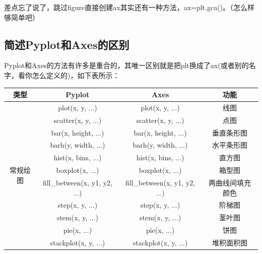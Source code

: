 \documentclass[12pt]{article}
\begin{document}
差点忘了说了，跳过figure直接创建ax其实还有一种方法，ax=plt.gca()。（怎么样够简单吧）
\newpage
\subsection{简述Pyplot和Axes的区别}

Pyplot和Axes的方法有许多是重合的，其唯一区别就是把plt换成了ax(或者别的名字，看你怎么定义的)，如下表所示：

\begin{table}[H]
\centering
\begin{tabular}{|c|c|c|c|}
\hline
类型                     & Pyplot                        & Axes                          & 功能           \\ \hline
\multirow{11}{*}{常规绘图} & plot(x, y, ...)               & plot(x, y, ...)               & 线图           \\ \cline{2-4} 
                       & scatter(x, y, ...)            & scatter(x, y, ...)            & 点图           \\ \cline{2-4} 
                       & bar(x, height, ...)           & bar(x, height, ...)           & 垂直条形图        \\ \cline{2-4} 
                       & barh(y, width, ...)           & barh(y, width, ...)           & 水平条形图        \\ \cline{2-4} 
                       & hist(x, bins, ...)            & hist(x, bins, ...)            & 直方图          \\ \cline{2-4} 
                       & boxplot(x, ...)               & boxplot(x, ...)               & 箱型图          \\ \cline{2-4} 
                       & fill\_between(x, y1, y2, ...) & fill\_between(x, y1, y2, ...) & 两曲线间填充颜色  \\ \cline{2-4} 
                       & step(x, y, ...)               & step(x, y, ...)               & 阶梯图          \\ \cline{2-4} 
                       & stem(x, y, ...)               & stem(x, y, ...)               & 茎叶图          \\ \cline{2-4} 
                       & pie(x, ...)                   & pie(x, ...)                   & 饼图           \\ \cline{2-4} 
                       & stackplot(x, y, ...)          & stackplot(x, y, ...)          & 堆积面积图        \\ \hline

\end{tabular}
\end{table}
\end{document}
